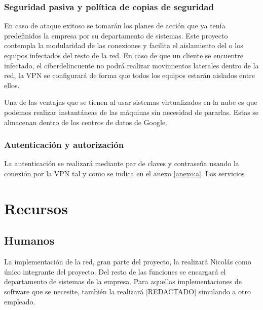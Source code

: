 \subsubsection{Seguridad pasiva y política de copias de seguridad}

En caso de ataque exitoso se tomarán los planes de acción que ya tenía predefinidos la empresa por su departamento de sistemas. Este proyecto contempla la modularidad de las conexiones y facilita el aislamiento del o los equipos infectados del resto de la red. En caso de que un cliente se encuentre infectado, el ciberdelincuente no podrá realizar movimientos laterales dentro de la red, la VPN se configurará de forma que todos los equipos estarán aislados entre ellos.

Una de las ventajas que se tienen al usar sistemas virtualizados en la nube es que podemos realizar instantáneas de las máquinas sin necesidad de pararlas. Estas se almacenan dentro de los centros de datos de Google. 

\subsubsection{Autenticación y autorización}

La autenticación se realizará mediante par de claves y contraseña usando la conexión por la VPN tal y como se indica en el anexo \ref{anexo:a}. Los servicios

\section{Recursos}
\subsection{Humanos}
La implementación de la red, gran parte del proyecto, la realizará Nicolás como único integrante del proyecto. Del resto de las funciones se encargará el departamento de sistemas de la empresa. Para aquellas implementaciones de software que se necesite, también la realizará [REDACTADO] simulando a otro empleado.
